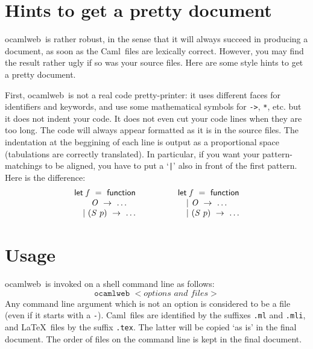 \documentclass[12pt]{article}
\newcommand{\Caml}{\textsf{Caml}}
\newcommand{\ocamlweb}{\textsf{ocamlweb}}
\begin{document}

\section{Hints to get a pretty document}

\ocamlweb\ is rather robust, in the sense that it will always succeed
in producing a document, as soon as the \Caml\ files are lexically
correct. However, you may find the result rather ugly if so was your
source files. Here are some style hints to get a pretty document.

First, \ocamlweb\ is not a real code pretty-printer: it uses different
faces for identifiers and keywords, and use some mathematical symbols
for \verb!->!, \verb!*!, etc. but it does not indent your code. It
does not even cut your code lines when they are too long. The code
will always appear formatted as it is in the source files. The
indentation at the beggining of each line is output as a proportional
space (tabulations are correctly translated). In particular, if you
want your pattern-matchings to be aligned, you have to put a `\verb!|!'
also in front of the first pattern. Here is the difference:
\begin{displaymath}
  \begin{array}{l}
    \mathsf{let}~\mathit{f}~=~\mathsf{function} \\
    \kern2em\mathit{O}~\rightarrow~\dots \\
    \kern1em|~(\mathit{S}~p)~\rightarrow~\dots
  \end{array}
  \qquad\qquad
  \begin{array}{l}
    \mathsf{let}~\mathit{f}~=~\mathsf{function} \\
    \kern1em|~\mathit{O}~\rightarrow~\dots \\
    \kern1em|~(\mathit{S}~p)~\rightarrow~\dots
  \end{array}
\end{displaymath}



\section{Usage}

\ocamlweb\ is invoked on a shell command line as follows:
\begin{displaymath}
  \texttt{ocamlweb }<\textit{options and files}>
\end{displaymath}
Any command line argument which is not an option is considered to be a
file (even if it starts with a \verb!-!). \Caml\ files are identified
by the suffixes \verb!.ml! and \verb!.mli!, and \LaTeX\ files by the
suffix \verb!.tex!. The latter will be copied `as is' in the final
document. The order of files on the command line is kept in the final
document.
\end{document}
